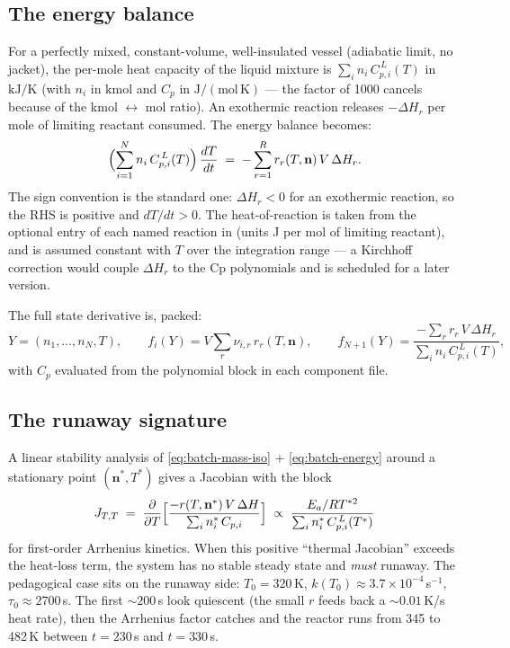 \documentclass[11pt,a4paper]{article}
\newcommand{\nv}{\mathbf{n}}                          %
\begin{document}
\subsection*{The energy balance}

For a perfectly mixed, constant-volume, well-insulated vessel
(adiabatic limit, no jacket), the per-mole heat capacity of the
liquid mixture is $\sum_i n_i\,C_{p,i}^{\,L}(T)$ in $\mathrm{kJ/K}$
(with $n_i$ in $\mathrm{kmol}$ and $C_p$ in $\mathrm{J/(mol\,K)}$ ---
the factor of 1000 cancels because of the kmol $\leftrightarrow$ mol
ratio).  An exothermic reaction releases $-\Delta H_r$ per mole of
limiting reactant consumed.  The energy balance becomes:
\begin{equation}
    \Bigl(\sum_{i=1}^{N} n_i\, C_{p,i}^{\,L}(T)\Bigr)\,\frac{dT}{dt}
    \;=\; -\sum_{r=1}^{R} r_r(T, \nv)\, V\, \Delta H_r.
    \label{eq:batch-energy}
\end{equation}
The sign convention is the standard one: $\Delta H_r < 0$ for an
exothermic reaction, so the RHS is positive and $dT/dt > 0$.  The
heat-of-reaction is taken from the optional
 entry of each named reaction in
 (units J per mol of limiting reactant),
and is assumed constant with $T$ over the integration range --- a
Kirchhoff correction would couple $\Delta H_r$ to the Cp polynomials
and is scheduled for a later version.

The full state derivative is, packed:
\[
    Y = (n_1, \ldots, n_N, T),
    \qquad
    f_i(Y) = V \sum_r \nu_{i,r}\, r_r(T, \nv),
    \qquad
    f_{N+1}(Y) = \frac{-\sum_r r_r\, V\, \Delta H_r}{\sum_i n_i\, C_{p,i}^{\,L}(T)},
\]
with $C_p$ evaluated from the polynomial
 block in each component file.

\subsection*{The runaway signature}

A linear stability analysis of \eqref{eq:batch-mass-iso} +
\eqref{eq:batch-energy} around a stationary point $(\nv^{*}, T^{*})$
gives a Jacobian with the block
\[
    J_{T,T}
    \;=\; \frac{\partial}{\partial T}
    \Bigl[\frac{-r(T, \nv^{*})\, V\, \Delta H}{\sum_i n_i^{*}\, C_{p,i}}\Bigr]
    \;\propto\;
    \frac{E_a / RT^{*2}}{\sum_i n_i^{*}\,C_{p,i}^{\,L}(T^{*})}
\]
for first-order Arrhenius kinetics.  When this positive
``thermal Jacobian'' exceeds the heat-loss term, the system has no
stable steady state and \emph{must} runaway.  The pedagogical
case  sits on the runaway
side: $T_0 = 320$\,K, $k(T_0) \approx 3.7\times 10^{-4}$\,s$^{-1}$,
$\tau_0 \approx 2700$\,s.  The first $\sim 200$\,s look quiescent
(the small $r$ feeds back a $\sim 0.01$\,K/s heat rate), then the
Arrhenius factor catches and the reactor runs from 345 to 482\,K
between $t = 230$\,s and $t = 330$\,s.
\end{document}
